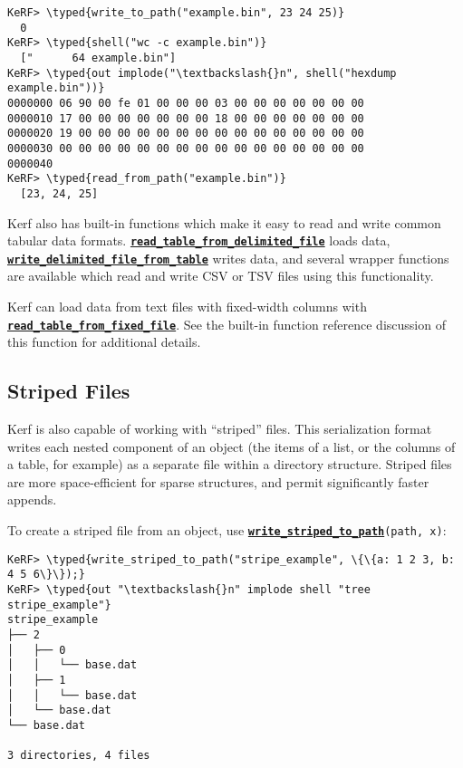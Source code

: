 \documentclass{article}
\newcommand{\typed}[1]{\textcolor{TealBlue}{#1}}
\newcommand{\primu}[2]{\hyperref[prim:#2]{\textbf{\texttt{#1}}}}
\begin{document}
\begin{Verbatim}
KeRF> \typed{write_to_path("example.bin", 23 24 25)}
  0
KeRF> \typed{shell("wc -c example.bin")}
  ["      64 example.bin"]
KeRF> \typed{out implode("\textbackslash{}n", shell("hexdump example.bin"))}
0000000 06 90 00 fe 01 00 00 00 03 00 00 00 00 00 00 00
0000010 17 00 00 00 00 00 00 00 18 00 00 00 00 00 00 00
0000020 19 00 00 00 00 00 00 00 00 00 00 00 00 00 00 00
0000030 00 00 00 00 00 00 00 00 00 00 00 00 00 00 00 00
0000040
KeRF> \typed{read_from_path("example.bin")}
  [23, 24, 25]
\end{Verbatim}

Kerf also has built-in functions which make it easy to read and write common tabular data formats. \primu{read\_table\_from\_delimited\_file}{readTableFromDelimitedFile} loads data, \primu{write\_delimited\_file\_from\_table}{writeDelimitedFileFromTable} writes data, and several wrapper functions are available which read and write CSV or TSV files using this functionality.

\vspace{0.5cm}

Kerf can load data from text files with fixed-width columns with \primu{read\_table\_from\_fixed\_file}{readTableFromFixedFile}. See the built-in function reference discussion of this function for additional details.

\pagebreak

\subsection{Striped Files}\label{sec:stripeio}
Kerf is also capable of working with ``striped'' files. This serialization format writes each nested component of an object (the items of a list, or the columns of a table, for example) as a separate file within a directory structure. Striped files are more space-efficient for sparse structures, and permit significantly faster appends.

\vspace{0.5cm}

To create a striped file from an object, use \primu{write\_striped\_to\_path}{writeStripedToPath}\texttt{(path, x)}:
\begin{Verbatim}
KeRF> \typed{write_striped_to_path("stripe_example", \{\{a: 1 2 3, b: 4 5 6\}\});}
KeRF> \typed{out "\textbackslash{}n" implode shell "tree stripe_example"}
stripe_example
├── 2
│   ├── 0
│   │   └── base.dat
│   ├── 1
│   │   └── base.dat
│   └── base.dat
└── base.dat

3 directories, 4 files 
\end{Verbatim}
\end{document}

